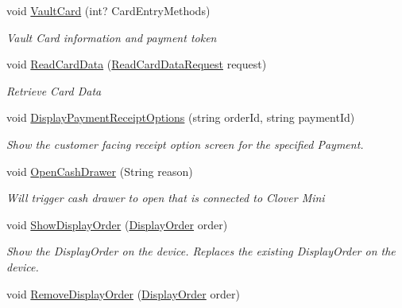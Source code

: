 \begin{DoxyCompactItemize}
void \hyperlink{classcom_1_1clover_1_1remotepay_1_1sdk_1_1_clover_connector_a26e95230422276f47542882628b5038f}{Vault\+Card} (int? Card\+Entry\+Methods)
\begin{DoxyCompactList}\small\item\em Vault Card information and payment token \end{DoxyCompactList}\item 
void \hyperlink{classcom_1_1clover_1_1remotepay_1_1sdk_1_1_clover_connector_a0901566c92bbce70865b3ae144e42cdc}{Read\+Card\+Data} (\hyperlink{classcom_1_1clover_1_1remotepay_1_1sdk_1_1_read_card_data_request}{Read\+Card\+Data\+Request} request)
\begin{DoxyCompactList}\small\item\em Retrieve Card Data \end{DoxyCompactList}\item 
void \hyperlink{classcom_1_1clover_1_1remotepay_1_1sdk_1_1_clover_connector_a3c71f60836d40aa51b70841f7be6cf30}{Display\+Payment\+Receipt\+Options} (string order\+Id, string payment\+Id)
\begin{DoxyCompactList}\small\item\em Show the customer facing receipt option screen for the specified Payment. \end{DoxyCompactList}\item 
void \hyperlink{classcom_1_1clover_1_1remotepay_1_1sdk_1_1_clover_connector_aeeba2f27e901c6f105dbd9cdc624bd2c}{Open\+Cash\+Drawer} (String reason)
\begin{DoxyCompactList}\small\item\em Will trigger cash drawer to open that is connected to Clover Mini \end{DoxyCompactList}\item 
void \hyperlink{classcom_1_1clover_1_1remotepay_1_1sdk_1_1_clover_connector_abfa384bfc0c016908d137e0332b7e06c}{Show\+Display\+Order} (\hyperlink{classcom_1_1clover_1_1remote_1_1order_1_1_display_order}{Display\+Order} order)
\begin{DoxyCompactList}\small\item\em Show the Display\+Order on the device. Replaces the existing Display\+Order on the device. \end{DoxyCompactList}\item 
void \hyperlink{classcom_1_1clover_1_1remotepay_1_1sdk_1_1_clover_connector_af5a1b2bddf01b44eaa40af3f8212451b}{Remove\+Display\+Order} (\hyperlink{classcom_1_1clover_1_1remote_1_1order_1_1_display_order}{Display\+Order} order)

\end{DoxyCompactItemize}
